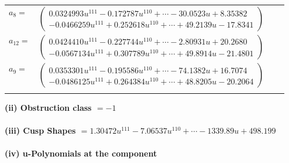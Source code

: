 \documentclass[1p]{elsarticle_modified}
\theoremstyle{definition}
\begin{document}
\begin{tabular}{m{7pt} m{180pt} m{7pt} m{180pt} }
\flushright $a_{8}=$&$\begin{pmatrix}0.0324993 u^{111}-0.172787 u^{110}+\cdots-30.0523 u+8.35382\\-0.0466259 u^{111}+0.252618 u^{110}+\cdots+49.2139 u-17.8341\end{pmatrix}$ \\
\flushright $a_{12}=$&$\begin{pmatrix}0.0424410 u^{111}-0.227744 u^{110}+\cdots-2.80931 u+20.2680\\-0.0567134 u^{111}+0.307789 u^{110}+\cdots+49.8914 u-21.4801\end{pmatrix}$ \\
\flushright $a_{9}=$&$\begin{pmatrix}0.0353301 u^{111}-0.195586 u^{110}+\cdots-74.1382 u+16.7074\\-0.0486125 u^{111}+0.264384 u^{110}+\cdots+48.8205 u-20.2064\end{pmatrix}$\\&\end{tabular}
\flushleft \textbf{(ii) Obstruction class $= -1$}\\~\\
\flushleft \textbf{(iii) Cusp Shapes $= 1.30472 u^{111}-7.06537 u^{110}+\cdots-1339.89 u+498.199$}\\~\\
\newpage\renewcommand{\arraystretch}{1}
\flushleft \textbf{(iv) u-Polynomials at the component}\newline \\
\end{document}
